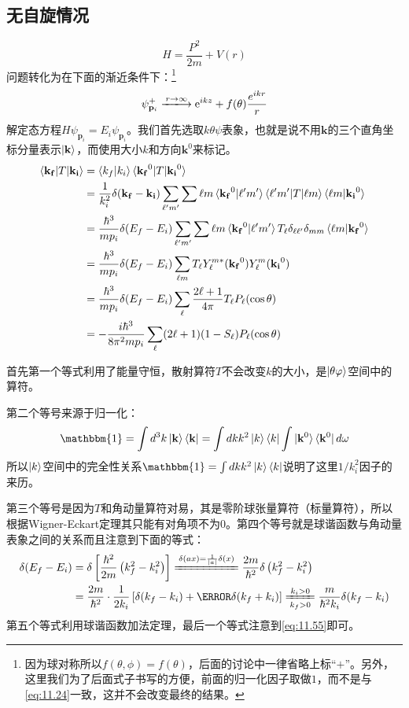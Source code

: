 \documentclass[a4paper,zihao=-4,linespread=1]{ctexrep}
\begin{document}
	\subsection{无自旋情况}
	\[H=\frac{P^2}{2m}+V(r)\]
	问题转化为在下面的渐近条件下：\footnote{因为球对称所以$f(\theta,\phi)=f(\theta)$，后面的讨论中一律省略上标“$+$”。另外，这里我们为了后面式子书写的方便，前面的归一化因子取做$1$，而不是与\ref{eq:11.24}一致，这并不会改变最终的结果。}
	\[\psi_{\mathbf{p}_i}^+\xlongrightarrow{r\to\infty}\mathrm{e}^{ikz}+f(\theta)\frac{e^{ikr}}{r}\]
	解定态方程$H\psi_{\mathbf{p}_i}=E_i\psi_{\mathbf{p}_i}$。我们首先选取$k\theta\psi$表象，也就是说不用$\mathbf{k}$的三个直角坐标分量表示$\ket{\mathbf{k}}$，而使用大小$k$和方向$\mathbf{k}^0$来标记。
	\begin{equation}
		\begin{aligned}
			\braket{\mathbf{k_f}|T|\mathbf{k_i}}&=\braket{{k_f}|{k_i}}\braket{\mathbf{k_f}^0|T|\mathbf{k_i}^0}\\
			&=\frac{1}{k_i^2}\delta(\mathbf{k_f}-\mathbf{k_i})\sum_{\ell^\prime m^\prime}\sum{\ell m}\braket{\mathbf{k_f}^0|\ell^\prime m^\prime}\braket{\ell^\prime m^\prime |T |\ell m}\braket{\ell m|\mathbf{k_i}^0}\\
			&=\frac{\hbar^3}{m p_i}\delta(E_f-E_i)\sum_{\ell^\prime m^\prime}\sum{\ell m}\braket{\mathbf{k_f}^0|\ell^\prime m^\prime}T_\ell\delta_{\ell\ell^\prime}\delta_{mm}\braket{\ell m|\mathbf{k_f}^0}\\
			&=\frac{\hbar^3}{m p_i}\delta(E_f-E_i)\sum_{\ell m} T_\ell Y^{m*}_\ell(\mathbf{k_f}^0)Y^{m}_\ell(\mathbf{k_i}^0)\\
			&=\frac{\hbar^3}{m p_i}\delta(E_f-E_i)\sum_\ell\frac{2\ell+1}{4\pi}T_\ell P_\ell(\cos\theta)\\
			&=-\frac{i\hbar^3}{8\pi^2m p_i}\sum_\ell (2\ell+1)(1-S_\ell)P_\ell(\cos\theta)
		\end{aligned}
	\end{equation}
	
	首先第一个等式利用了能量守恒，散射算符$T$不会改变$k$的大小，是$\ket{\theta\varphi}$空间中的算符。
	
	第二个等号来源于归一化：
	\[\mathbbm{1}=\int d^3k\ket{\mathbf{k}}\bra{\mathbf{k}}=\int dkk^2\ket{{k}}\bra{{k}}\int \ket{\mathbf{k}^0}\bra{\mathbf{k}^0}d\omega\]
	所以$\ket{k}$空间中的完全性关系$\mathbbm{1}=\int dkk^2\ket{{k}}\bra{{k}}$说明了这里$1/k^2_i$因子的来历。
	
	第三个等号是因为$T$和角动量算符对易，其是零阶球张量算符（标量算符），所以根据Wigner-Eckart定理其只能有对角项不为0。第四个等号就是球谐函数与角动量表象之间的关系而且注意到下面的等式：
	\begin{equation}
		\begin{aligned}
			\delta(E_f-E_i)&=\delta\left[\frac{\hbar^2}{2m}\left(k_f^2-k_i^2\right)\right]\xlongequal{\delta(ax)=\frac{1}{|a|}\delta(x)}\frac{2m}{\hbar^2}\delta\left(k_f^2-k_i^2\right)\\
			&=\frac{2m}{\hbar^2}\cdot\frac{1}{2k_i}\left[\delta(k_f-k_i)+\cancel{\delta(k_f+k_i)}\right]\xlongequal[k_f>0]{k_i>0}\frac{m}{\hbar^2k_i}\delta(k_f-k_i)
		\end{aligned}
	\end{equation}
	第五个等式利用球谐函数加法定理，最后一个等式注意到\ref{eq:11.55}即可。
	
\end{document}
